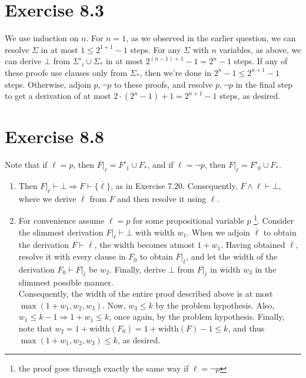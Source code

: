 \documentclass{article}
\begin{document}
\section*{Exercise 8.3}
We use induction on $n$. For $n = 1$, as we observed in the earlier question, we can resolve $\Sigma$ in at most $1\leq 2^{1+1}-1$ steps. For any $\Sigma$ with $n$ variables, as above, we can derive $\bot$ from $\Sigma'_i\cup\Sigma_*$ in at most $2^{(n-1)+1}-1 = 2^n - 1$ steps. If any of these proofs use clauses only from $\Sigma_*$, then we're done in $2^{n} - 1\leq 2^{n+1} - 1$ steps. Otherwise, adjoin $p, \lnot p$ to these proofs, and resolve $p, \lnot p$ in the final step to get a derivation of at most $2\cdot (2^n - 1) + 1 = 2^{n+1} - 1$ steps, as desired.
\section*{Exercise 8.8}
Note that if $\ell = p$, then $F|_\ell = F'_1\cup F_*$, and if $\ell = \lnot p$, then $F|_\ell = F'_0\cup F_*$. \\
\begin{enumerate}
    \item Then $F|_\ell\vdash\bot\Rightarrow F\vdash\{\overline{\ell}\}$, as in Exercise 7.20. Consequently, $F\wedge\ell\vdash\bot$, where we derive $\overline{\ell}$ from $F$ and then resolve it using $\ell$. 
    \item For convenience assume $\ell = p$ for some propositional variable $p$ \footnote{the proof goes through exactly the same way if $\ell = \lnot p$}. Consider the slimmest derivation $F|_\ell\vdash\bot$ with width $w_1$. When we adjoin $\overline{\ell}$ to obtain the derivation $F\vdash\overline{\ell}$, the width becomes atmost $1 + w_1$. Having obtained $\overline{\ell}$, resolve it with every clause in $F_0$ to obtain $F|_{\overline{\ell}}$, and let the width of the derivation $F_0\vdash F|_{\overline{\ell}}$ be $w_2$. Finally, derive $\bot$ from $F|_{\overline{\ell}}$ in width $w_3$ in the slimmest possible manner.\\
    Consequently, the width of the entire proof described above is at most $\max(1 + w_1, w_2, w_3)$. Now, $w_3\leq k$ by the problem hypothesis. Also, $w_1\leq k - 1\Rightarrow 1 + w_1\leq k$, once again, by the problem hypothesis. Finally, note that $w_2 = 1 + \mathrm{width}(F_0) = 1 + \mathrm{width}(F) - 1 \leq k$, and thus $\max(1 + w_1, w_2, w_3)\leq k$, as desired.
\end{enumerate}
\end{document}

